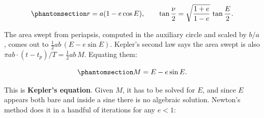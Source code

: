 \documentclass[
  10.5pt,
  letterpaper,
]{scrbook}
\theoremstyle{plain}
\theoremstyle{remark}
\begin{document}
\begin{equation}\protect\phantomsection\label{eq-eccentric-anomaly}{
r = a(1 - e\cos E), \qquad
\tan\frac{\nu}{2} = \sqrt{\frac{1+e}{1-e}}\,\tan\frac{E}{2}.
}\end{equation}

The area swept from periapsis, computed in the auxiliary circle and
scaled by \(b/a\), comes out to \(\tfrac12 ab\,(E - e\sin E)\). Kepler's
second law says the area swept is also
\(\pi ab \cdot (t-t_p)/T = \tfrac12 ab\,M\). Equating them:

\begin{equation}\protect\phantomsection\label{eq-kepler-equation}{
M = E - e\sin E.
}\end{equation}

This is \textbf{Kepler's equation}. Given \(M\), it has to be solved for
\(E\), and since \(E\) appears both bare and inside a sine there is no
algebraic solution. Newton's method does it in a handful of iterations
for any \(e < 1\):
\end{document}

